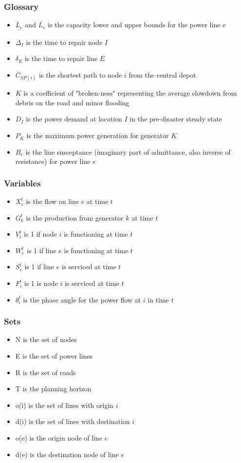 \documentclass{article}
\begin{document}
	\subsubsection{Glossary}
	\begin{itemize}
		\item $\underline{L_e}$ and $\overline{L_e}$ is the capacity lower and upper bounds for the power line $e$
		\item $\Delta_{I}$ is the time to repair node $I$
		\item $\delta_{E}$ is the time to repair line $E$
		\item $C_{SP(i)}$ is the shortest path to node $i$ from the central depot
		\item $K$ is a coefficient of "broken-ness" representing the average slowdown from debris on the road and minor flooding
		\item $D_I$ is the power demand at location $I$ in the pre-disaster steady state
		\item $P_K$ is the maximum power generation for generator $K$
		\item $B_e$ is the line susceptance (imaginary part of admittance, also inverse of resistance) for power line $e$
	\end{itemize}
	\subsubsection{Variables}
	\begin{itemize}
		
		\item $X_{e}^{t}$ is the flow on line $e$ at time $t$
		\item $G_{k}^t$ is the production from generator $k$ at time $t$
		\item $V_i^t$ is 1 if node $i$ is functioning at time $t$
		\item $W_{e}^t$ is 1 if line $e$ is functioning at time $t$
		\item $S_{e}^t$ is 1 if line $e$ is serviced at time $t$
		\item $F_i^t$ is 1 is node $i$ is serviced at time $t$ 
		\item $\theta_i^t$ is the phase angle for the power flow at $i$ in time $t$
		
	\end{itemize}
	\subsubsection{Sets}
	\begin{itemize}
		\item N is the set of nodes
		\item E is the set of power lines
		\item R is the set of roads
		\item T is the planning horizon
		\item o(i) is the set of lines with origin $i$
		\item d(i) is the set of lines with destination $i$
		\item o(e) is the origin node of line $e$
		\item d(e) is the destination node of line $e$
	\end{itemize}
\end{document}
